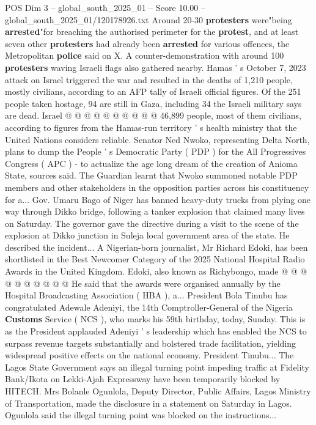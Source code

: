 \begin{textsample}{POS Dim 3 – global\_south\_2025\_01 – Score 10.00 – global\_south\_2025\_01/120178926.txt}
Around 20-30 \textbf{protesters} were"being \textbf{arrested}"for breaching the authorised perimeter for the \textbf{protest}, and at least seven other \textbf{protesters} had already been \textbf{arrested} for various offences, the Metropolitan \textbf{police} said on X.
A counter-demonstration with around 100 \textbf{protesters} waving Israeli flags also gathered nearby.
Hamas ' s October 7, 2023 attack on Israel triggered the war and resulted in the deaths of 1,210 people, mostly civilians, according to an AFP tally of Israeli official figures.
Of the 251 people taken hostage, 94 are still in Gaza, including 34 the Israeli military says are dead.
Israel @ @ @ @ @ @ @ @ @ @ 46,899 people, most of them civilians, according to figures from the Hamas-run territory ' s health ministry that the United Nations considers reliable.
Senator Ned Nwoko, representing Delta North, plans to dump the People ' s Democratic Party ( PDP ) for the All Progressives Congress ( APC ) - to actualize the age long dream of the creation of Anioma State, sources said.
The Guardian learnt that Nwoko summoned notable PDP members and other stakeholders in the opposition parties across his constituency for a...
Gov.
Umaru Bago of Niger has banned heavy-duty trucks from plying one way through Dikko bridge, following a tanker explosion that claimed many lives on Saturday.
The governor gave the directive during a visit to the scene of the explosion at Dikko junction in Suleja local government area of the state.
He described the incident...
A Nigerian-born journalist, Mr Richard Edoki, has been shortlisted in the Best Newcomer Category of the 2025 National Hospital Radio Awards in the United Kingdom.
Edoki, also known as Richybongo, made @ @ @ @ @ @ @ @ @ @ He said that the awards were organised annually by the Hospital Broadcasting Association ( HBA ), a...
President Bola Tinubu has congratulated Adewale Adeniyi, the 14th Comptroller-General of the Nigeria \textbf{Customs} Service ( NCS ), who marks his 59th birthday, today, Sunday.
This is as the President applauded Adeniyi ' s leadership which has enabled the NCS to surpass revenue targets substantially and bolstered trade facilitation, yielding widespread positive effects on the national economy.
President Tinubu...
The Lagos State Government says an illegal turning point impeding traffic at Fidelity Bank/Ikota on Lekki-Ajah Expressway have been temporarily blocked by HITECH.
Mrs Bolanle Ogunlola, Deputy Director, Public Affairs, Lagos Ministry of Transportation, made the disclosure in a statement on Saturday in Lagos.
Ogunlola said the illegal turning point was blocked on the instructions...

\end{textsample}
